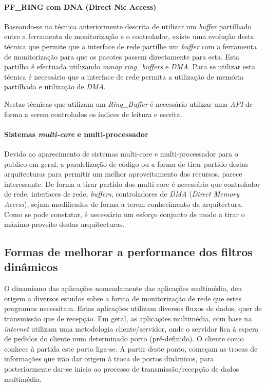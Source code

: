 \paragraph*{PF\_RING com DNA (Direct Nic Access)}
Baseando-se na técnica anteriormente descrita de utilizar um \textit{buffer} partilhado entre a ferramenta de monitorização e o controlador, existe uma evolução desta técnica que permite que a interface de rede partilhe um \textit{buffer} com a ferramenta de monitorização para que os pacotes passem directamente para esta.
Esta partilha é efectuada utilizando \textit{mmap} \textit{ring\_buffers} e \textit{DMA}.
Para se utilizar esta técnica é necessário que a interface de rede permita a utilização de memória partilhada e utilização de \textit{DMA}.

Nestas técnicas que utilizam um \textit{Ring\_Buffer} é necessário utilizar uma \textit{API} de forma a serem controlados os índices de leitura e escrita\cite{:IntroPF_RIDNADirecNICAcces}.

\paragraph*{Sistemas \textit{multi-core} e multi-processador}
Devido ao aparecimento de sistemas multi-core e multi-processador para o publico em geral, a paralelização de código ou a forma de tirar partido destas arquitecturas para permitir um melhor aproveitamento dos recursos, parece interessante. 
De forma a tirar partido dos multi-core é necessário que controlador de rede, interfaces de rede, \textit{buffers}, controladores de \textit{DMA} (\textit{Direct Memory Access}), sejam modificados de forma a terem conhecimento da arquitectura. Como se pode constatar, é necessário um esforço conjunto de modo a tirar o máximo proveito destas arquitecturas\cite{Deri:2010}.




\subsection{Formas de melhorar a performance dos filtros dinâmicos}
 O dinamismo das aplicações nomeadamente das aplicações multimédia, deu origem a diversos estudos sobre a forma de monitorização de rede que estes programas necessitam.
Estas aplicações utilizam diversos fluxos de dados, quer de transmissão que de recepção. Em geral, as aplicações multimédia, com base na \textit{internet} utilizam uma metodologia cliente/servidor, onde o servidor fica à espera de pedidos do cliente num determinado porto (pré-definido). O cliente como conhece à partida este porto liga-se. A partir deste ponto, começam as trocas de informações que irão dar origem à troca de portos dinâmicos, para posteriormente dar-se inicio ao processo de transmissão/recepção de dados multimédia.

